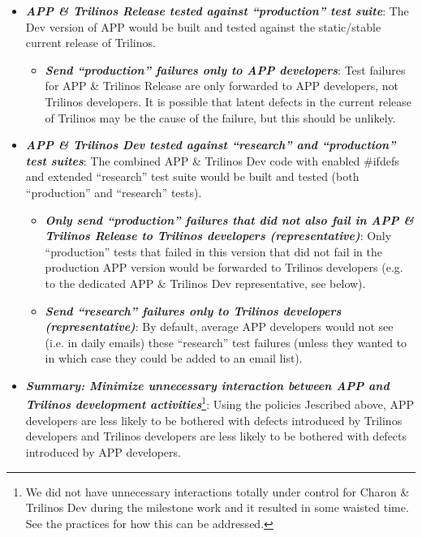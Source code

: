 \documentclass[pdf,ps2pdf,11pt]{SANDreport}
\begin{document}
  \begin{itemize}

  {}\item\textit{\textbf{APP \& Trilinos Release tested against ``production''
  test suite}}: The Dev version of APP would be built and tested against the
  static/stable current release of Trilinos.

    \begin{itemize}

    {}\item\textit{\textbf{Send ``production'' failures only to APP
    developers}}: Test failures for APP \& Trilinos Release are only forwarded
    to APP developers, not Trilinos developers.  It is possible that latent
    defects in the current release of Trilinos may be the cause of the
    failure, but this should be unlikely.

    \end{itemize}

  {}\item\textit{\textbf{APP \& Trilinos Dev tested against ``research'' and
  ``production'' test suites}}: The combined APP \& Trilinos Dev code with
  enabled {}\#ifdefs and extended ``research'' test suite would be built and
  tested (both ``production'' and ``research'' tests).

    \begin{itemize}

    {}\item\textit{\textbf{Only send ``production'' failures that did not also
    fail in APP \& Trilinos Release to Trilinos developers (representative)}}:
    Only ``production'' tests that failed in this version that did not fail in
    the production APP version would be forwarded to Trilinos developers
    (e.g. to the dedicated APP \& Trilinos Dev representative, see below).

    {}\item\textit{\textbf{Send ``research'' failures only to Trilinos
    developers (representative)}}: By default, average APP developers would
    not see (i.e. in daily emails) these ``research'' test failures (unless
    they wanted to in which case they could be added to an email list).

    \end{itemize}

  {}\item\textit{\textbf{Summary: Minimize unnecessary interaction between APP
  and Trilinos development activities}}\footnote{We did not have unnecessary
  interactions totally under control for Charon \& Trilinos Dev during the
  milestone work and it resulted in some waisted time.  See the practices for
  how this can be addressed.}: Using the policies Jescribed above, APP
  developers are less likely to be bothered with defects introduced by
  Trilinos developers and Trilinos developers are less likely to be bothered
  with defects introduced by APP developers.
                
  \end{itemize}
\end{document}
